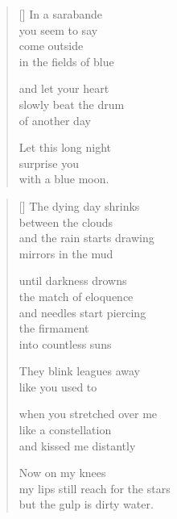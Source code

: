 \documentclass[14pt]{extbook}
\newcommand*{\centeredornament}{\centerline{\pgfornament[width=6cm]{88}}}
\begin{document}
\newpage

\settowidth{\versewidth}{slowly beat the drum}

\begin{verse}[\versewidth]
  In a sarabande \\
  you seem to say \\
  come outside \\
  in the fields of blue

  and let your heart \\
  slowly beat the drum \\
  of another day

  Let this long night \\
  surprise you \\
  with a blue moon.
\end{verse}


\newpage

\vspace*{-15mm}
\centeredornament
\vspace*{-7mm}


\settowidth{\versewidth}{my lips still reach for the stars}

\begin{verse}[\versewidth]
  The dying day shrinks \\
  between the clouds \\
  and the rain starts drawing \\
  mirrors in the mud

  until darkness drowns \\
  the match of eloquence \\
  and needles start piercing \\
  the firmament \\
  into countless suns

  They blink leagues away \\
  like you used to

  when you stretched over me \\
  like a constellation \\
  and kissed me distantly

  Now on my knees \\
  my lips still reach for the stars \\
  but the gulp is dirty water.
\end{verse}
\end{document}
